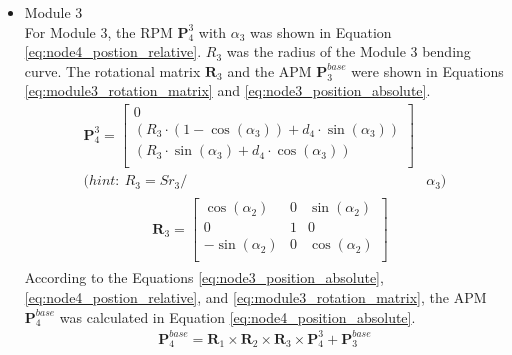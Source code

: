 \begin{itemize}
    \vspace{-15mm}
    \item Module 3 \\
    For Module 3, the RPM $\textbf{P}_{4}^{3}$ with $\alpha_3$ was shown in Equation \ref{eq:node4_postion_relative}. 
    $R_3$ was the radius of the Module 3 bending curve. The rotational matrix $\textbf{R}_{3}$ and the APM 
    $\textbf{P}_{3}^{base}$ were shown in Equations \ref*{eq:module3_rotation_matrix} and \ref{eq:node3_position_absolute}.
    \vspace{-5mm}
    \begin{align}
        \textbf{P}_{4}^{3} = 
        \begin{bmatrix}
            0 \\
            (R_3\cdot(1-\cos(\alpha_3)) + d_4\cdot \sin(\alpha_3)) \\
            (R_3\cdot \sin(\alpha_3) + d_4\cdot \cos(\alpha_3)) \\
        \end{bmatrix}&
        \label{eq:node4_postion_relative} \\
        \nonumber (hint: \ R_3 = {Sr}_3/ &\alpha_3)
    \end{align}
    \vspace{-15mm}
    \begin{align}
        &\begin{aligned}
            \textbf{R}_{3} = 
            \begin{bmatrix}
                \cos(\alpha_2) & 0 & \sin(\alpha_2) \\
                0 & 1 & 0 \\
                -\sin(\alpha_2) & 0 & \cos(\alpha_2) \\
            \end{bmatrix}
        \end{aligned}
        \label{eq:module3_rotation_matrix}
    \end{align}
    According to the Equations \ref{eq:node3_position_absolute}, \ref{eq:node4_postion_relative}, and 
    \ref*{eq:module3_rotation_matrix}, the APM $\textbf{P}_{4}^{base}$ was calculated in Equation \ref{eq:node4_position_absolute}.
    \vspace{-12mm}
    \begin{align}
        \textbf{P}_{4}^{base} = \textbf{R}_{1} \times\textbf{R}_{2} 
        \times\textbf{R}_{3} \times \textbf{P}_{4}^{3} + \textbf{P}_{3}^{base}
        \label{eq:node4_position_absolute}
    \end{align}

\end{itemize}
